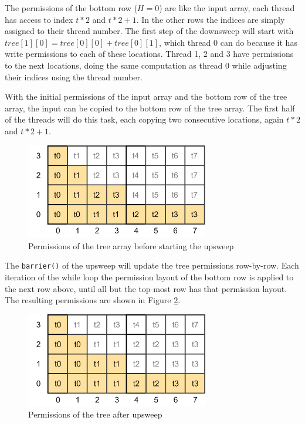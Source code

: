 \documentclass[a4paper]{article}
\newcommand{\code}[1]{\texttt{\small \color{inline}#1}} %
\begin{document}
The permissions of the bottom row ($H=0$) are like the input array, each thread has access to index $t*2$ and $t*2+1$. In the other rows the indices are simply assigned to their thread number. The first step of the downsweep will start with $tree[1][0] = tree[0][0] + tree[0][1]$, which thread 0 can do because it has write permissions to each of these locations. Thread 1, 2 and 3 have permissions to the next locations, doing the same computation as thread 0 while adjusting their indices using the thread number.

With the initial permissions of the input array and the bottom row of the tree array, the input can be copied to the bottom row of the tree array. The first half of the threads will do this task, each copying two consecutive locations, again $t*2$ and $t*2+1$.

\begin{figure}[htb!]
	\centering
	\includegraphics[width=80mm]{../images/tree-permissions-start-v1.png}
	\caption{Permissions of the tree array before starting the upsweep}
	\label{fig:treeArrayPermissionsStart}
\end{figure}
\FloatBarrier

The \code{barrier()} of the upsweep will update the tree permissions row-by-row. Each iteration of the while loop the permission layout of the bottom row is applied to the next row above, until all but the top-most row has that permission layout. The resulting permissions are shown in Figure \ref{fig:treeArrayPermissionsMiddle}.

\begin{figure}[htb!]
	\centering
	\includegraphics[width=80mm]{../images/tree-permissions-middle-v1.png}
	\caption{Permissions of the tree after upsweep}
	\label{fig:treeArrayPermissionsMiddle}
\end{figure}
\FloatBarrier
\end{document}

